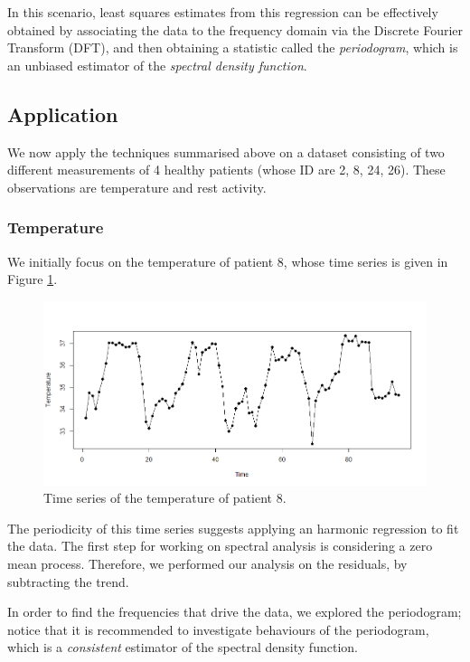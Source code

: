 \documentclass[]{article}
\begin{document}
In this scenario, least squares estimates from this regression can be effectively obtained by associating the data to the frequency domain via the Discrete Fourier Transform (DFT), and then obtaining a statistic called the \textit{periodogram}, which is an unbiased estimator of the \textit{spectral density function}. 

\subsection{Application}
We now apply the techniques summarised above on a dataset consisting of two different measurements of 4 healthy patients (whose ID are 2, 8, 24, 26). These observations are temperature and rest activity. 

\subsubsection*{Temperature}
We initially focus on the temperature of patient 8, whose time series is given in Figure \ref{fig:Temp8}.


\begin{figure}[ht]\centering
	\includegraphics[scale = 0.3]{Temp8.png}
	\caption{Time series of the temperature of patient 8.}
	\label{fig:Temp8}
\end{figure}

The periodicity of this time series suggests applying an harmonic regression to fit the data. The first step for working on spectral analysis is considering a zero mean process. Therefore, we performed our analysis on the residuals, by subtracting the trend. 

In order to find the frequencies that drive the data, we explored the periodogram; notice that it is recommended to investigate behaviours of the  periodogram, which is a \textit{consistent} estimator of the spectral density function. 
\end{document}
